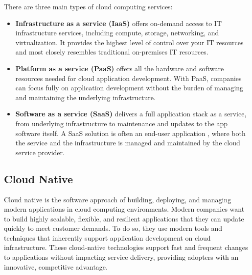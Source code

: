 	There are three main types of cloud computing services:
	\begin{itemize}
		\item \textbf{Infrastructure as a service (IaaS)} offers on-demand access to IT infrastructure services, 
		including compute, storage, networking, and virtualization. It provides the highest level of control over your IT 
		resources and most closely resembles traditional on-premises IT resources.
		\item \textbf{Platform as a service (PaaS)} offers all the hardware and software resources needed for cloud 
		application development. With PaaS, companies can focus fully on application development without 
		the burden of managing and maintaining the underlying infrastructure.
		\item \textbf{Software as a service (SaaS)} delivers a full application stack as a service, from underlying 
		infrastructure to maintenance and updates to the app software itself. A SaaS solution is often an end-user application
		, where both the service and the infrastructure is managed and maintained by the cloud service provider.
	\end{itemize}

	\subsection{Cloud Native}
		Cloud native \cite{cloudnative} is the software approach of building, deploying, and managing modern applications 
		in cloud computing environments. Modern companies want to build highly scalable, flexible, and 
		resilient applications that they can update quickly to meet customer demands. 
		To do so, they use modern tools and techniques that inherently support application
		development on cloud infrastructure. These cloud-native technologies support fast 
		and frequent changes to applications without impacting service delivery, providing
		adopters with an innovative, competitive advantage.

